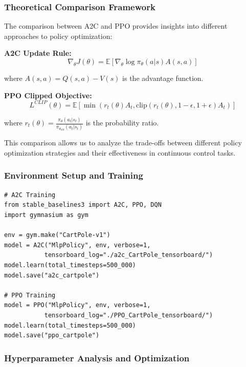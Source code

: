 \documentclass[12pt]{article}
\begin{document}
{{{\subsubsection{Theoretical Comparison Framework}

The comparison between A2C and PPO provides insights into different approaches to policy optimization:

\textbf{A2C Update Rule:}
\begin{equation}
\nabla_\theta J(\theta) = \mathbb{E}\left[\nabla_\theta \log \pi_\theta(a|s) A(s,a)\right]
\end{equation}

where $A(s,a) = Q(s,a) - V(s)$ is the advantage function.

\textbf{PPO Clipped Objective:}
\begin{equation}
L^{CLIP}(\theta) = \mathbb{E}\left[\min(r_t(\theta)A_t, \text{clip}(r_t(\theta), 1-\epsilon, 1+\epsilon)A_t)\right]
\end{equation}

where $r_t(\theta) = \frac{\pi_\theta(a_t|s_t)}{\pi_{\theta_{old}}(a_t|s_t)}$ is the probability ratio.

This comparison allows us to analyze the trade-offs between different policy optimization strategies and their effectiveness in continuous control tasks.

\subsubsection{Environment Setup and Training}

\begin{verbatim}
# A2C Training
from stable_baselines3 import A2C, PPO, DQN
import gymnasium as gym

env = gym.make("CartPole-v1")
model = A2C("MlpPolicy", env, verbose=1, 
           tensorboard_log="./a2c_CartPole_tensorboard/")
model.learn(total_timesteps=500_000)
model.save("a2c_cartpole")

# PPO Training
model = PPO("MlpPolicy", env, verbose=1, 
           tensorboard_log="./PPO_CartPole_tensorboard/")
model.learn(total_timesteps=500_000)
model.save("ppo_cartpole")
\end{verbatim}

\subsubsection{Hyperparameter Analysis and Optimization}

}}}
\end{document}

